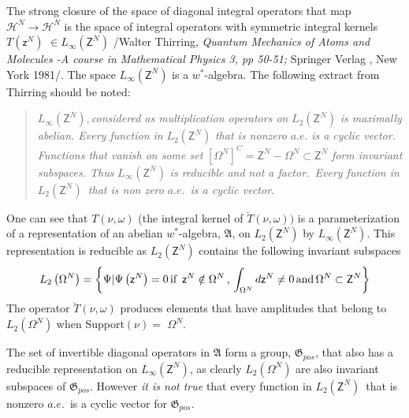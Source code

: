 \documentclass[aps,preprint]{revtex4}%
\begin{document}
The strong closure of the space of diagonal integral operators that map
$\mathcal{H}^{N}\rightarrow\mathcal{H}^{N}$ is the space of integral operators
with symmetric integral kernels $T\left(  \mathsf{z}^{N}\right)  $ $\in
L_{\infty}\left(  \mathsf{Z}^{N}\right)  $ /Walter Thirring, \textit{Quantum
Mechanics of Atoms and Molecules -A course in Mathematical Physics 3, pp
50-51; }Springer Verlag , New York 1981/. The space $L_{\infty}\left(
\mathsf{Z}^{N}\right)  $ is a $w^{\ast}$-algebra. The following extract from
Thirring should be noted:

\begin{quotation}
$L_{\infty}\left(  \mathsf{Z}^{N}\right)  ,$\textit{considered as
multiplication operators on} $L_{2}\left(  \mathsf{Z}^{N}\right)  $ \textit{is
maximally abelian. Every function in }$L_{2}\left(  \mathsf{Z}^{N}\right)  $
\textit{that is nonzero} $a.e.$ \textit{is a cyclic vector. Functions that
vanish on some set} $\left[  \Omega^{N}\right]  ^{C}=\mathsf{Z}^{N}-\Omega
^{N}\subset\mathsf{Z}^{N}$ \textit{form invariant subspaces. Thus} $L_{\infty
}\left(  \mathsf{Z}^{N}\right)  $ \textit{is reducible and not a
factor.}\emph{\ Every function in }$L_{2}\left(  \mathsf{Z}^{N}\right)
$\emph{\ that is non zero }$a.e.$\emph{\ is a cyclic vector.}
\end{quotation}

One can see that $T\left(  \nu,\omega\right)  $ (the integral kernel of
$\breve{T}\left(  \nu,\omega\right)  )$ is a parameterization of a
representation of an abelian $w^{\ast}$-algebra, $\mathfrak{A}$, on
$L_{2}\left(  \mathsf{Z}^{N}\right)  $ by $L_{\infty}\left(  \mathsf{Z}%
^{N}\right)  $. This representation is reducible as $L_{2}\left(
\mathsf{Z}^{N}\right)  $ contains the following invariant subspaces
\begin{equation}
L_{2}\left(  \Omega^{N}\right)  =\left\{  \Psi|\Psi\left(  \mathsf{z}%
^{N}\right)  =0\,\text{if \thinspace}\mathsf{z}^{N}\notin\Omega^{N}%
\,\text{,\thinspace}\int_{\Omega^{N}}d\mathsf{z}^{N}\neq0\,\text{and\thinspace
}\Omega^{N}\subset\mathsf{Z}^{N}\right\}
\end{equation}
The operator $\breve{T}\left(  \nu,\omega\right)  $ produces elements that
have amplitudes that belong to $L_{2}\left(  \Omega^{N}\right)  $ when
Support$\left(  \nu\right)  =$ $\Omega^{N}$.

The set of invertible diagonal operators in $\mathfrak{A}$ form a group,
$\mathfrak{G}_{pos}$, that also has a reducible representation on $L_{\infty
}\left(  \mathsf{Z}^{N}\right)  $, as clearly $L_{2}\left(  \Omega^{N}\right)
$ are also invariant subspaces of $\mathfrak{G}_{pos}$. However \emph{it is
not true} that every function in $L_{2}\left(  \mathsf{Z}^{N}\right)  $\ that
is nonzero $a.e.$\ is a cyclic vector for $\mathfrak{G}_{pos}$.
\end{document}
